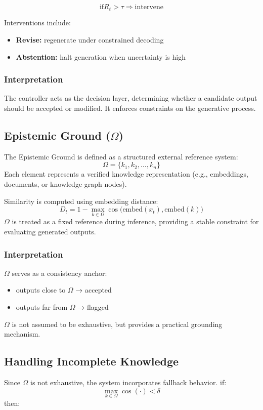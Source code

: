 \documentclass[12pt,a4paper]{article}
\begin{document}
\[
\text{if} R_t > \tau \Rightarrow \text{intervene}
\]

Interventions include:

\begin{itemize}
\item \textbf{Revise:} regenerate under constrained decoding
\item \textbf{Abstention:} halt generation when uncertainty is high
\end{itemize}
\subsubsection *{Interpretation}
The controller acts as the decision layer, determining whether a candidate output should be accepted or modified. It enforces constraints on the generative process.

\subsection{Epistemic Ground ($\Omega$)}
The Epistemic Ground is defined as a structured external reference system:
\[
\Omega = \{k_1, k_2, \ldots, k_n\}
\]
Each element represents a verified knowledge representation (e.g., embeddings, documents, or knowledge graph nodes).

Similarity is computed using embedding distance:
\[
D_t = 1 - \max_{k \in \Omega} \cos\big(\mathrm{embed}(x_t), \mathrm{embed}(k)\big)
\]
$\Omega$ is treated as a fixed reference during inference, providing a stable constraint for evaluating generated outputs.
\subsubsection *{Interpretation}
$\Omega$ serves as a consistency anchor:
\begin{itemize}
    \item outputs close to $\Omega$ → accepted
    \item outputs far from $\Omega$ → flagged
\end{itemize}
$\Omega$ is not assumed to be exhaustive, but provides a practical grounding mechanism.

\subsection{Handling Incomplete Knowledge}
Since $\Omega$ is not exhaustive, the system incorporates fallback behavior.
if:
\[
\max_{k \in \Omega} \cos\!\left(\cdot\right) < \delta
\]
then:
\end{document}
